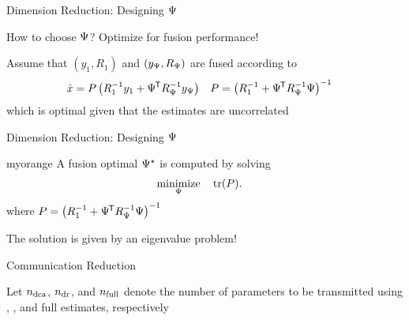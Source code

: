 \documentclass[aspectratio=1610]{beamer}
\begin{document}
\begin{frame}{Dimension Reduction: Designing $\M$}

How to choose $\M$? \alert{Optimize for fusion performance!}

\vspace{1em}

Assume that $(y_1,R_1)$ and $(\yM,\RM)$ are fused according to
\begin{align*}
    \xhat &= P\left( R_1\inv y_1 + \Mt\RM\inv\yM \right) &
    P &= \left(R_1\inv + \Mt\RM\inv\M \right)\inv
\end{align*}
which is optimal given that the estimates are uncorrelated

\end{frame}


\begin{frame}{Dimension Reduction: Designing $\M$}

\begin{rfshadedcolorbox}[title={Fusion Optimal Dimension Reduction}]{myorange}
    A fusion optimal $\Mopt$ is computed by solving
    \begin{equation*}
    	\begin{aligned}
    		& \underset{\M}{\minimize} & & \trace(P).
    	\end{aligned}
    \end{equation*}
    where $P=\left(R_1\inv + \Mt\RM\inv\M \right)\inv$
\end{rfshadedcolorbox}

\vspace{1em}

The solution is given by an eigenvalue problem!

\end{frame}


\begin{frame}{Communication Reduction}

Let $\ndca$, $\ndr$, and $\nfull$ denote the number of parameters to be transmitted using \abbrDCA, \abbrDR, and full estimates, respectively

\begin{figure}
    \centering
    \begin{tikzpicture}
        
    \end{tikzpicture}
\end{figure}


\end{frame}
\end{document}
